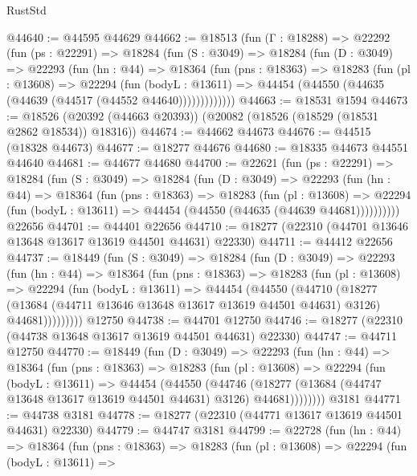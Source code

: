 \begin{lexlean}{RustStd}
\begin{coremodule}
@44640 := @44595 @44629
@44662 := @18513
    (fun (Γ : @18288) =>
    @22292
      (fun (ps : @22291) =>
      @18284
        (fun (S : @3049) =>
        @18284
          (fun (D : @3049) =>
          @22293
            (fun (hn : @44) =>
            @18364
              (fun (pns : @18363) =>
              @18283
                (fun (pl : @13608) =>
                @22294
                  (fun (bodyL : @13611) =>
                  @44454 (@44550 (@44635 (@44639 (@44517 (@44552 @44640)))))))))))))
@44663 := @18531 @1594
@44673 := @18526 (@20392 (@44663 @20393)) (@20082 (@18526 (@18529 (@18531 @2862 @18534)) @18316))
@44674 := @44662 @44673
@44676 := @44515 (@18328 @44673)
@44677 := @18277 @44676
@44680 := @18335 @44673 @44551 @44640
@44681 := @44677 @44680
@44700 := @22621
    (fun (ps : @22291) =>
    @18284
      (fun (S : @3049) =>
      @18284
        (fun (D : @3049) =>
        @22293
          (fun (hn : @44) =>
          @18364
            (fun (pns : @18363) =>
            @18283
              (fun (pl : @13608) =>
              @22294 (fun (bodyL : @13611) => @44454 (@44550 (@44635 (@44639 @44681))))))))))
    @22656
@44701 := @44401 @22656
@44710 := @18277 (@22310 (@44701 @13646 @13648 @13617 @13619 @44501 @44631) @22330)
@44711 := @44412 @22656
@44737 := @18449
    (fun (S : @3049) =>
    @18284
      (fun (D : @3049) =>
      @22293
        (fun (hn : @44) =>
        @18364
          (fun (pns : @18363) =>
          @18283
            (fun (pl : @13608) =>
            @22294
              (fun (bodyL : @13611) =>
              @44454
                (@44550
                  (@44710
                    (@18277
                      (@13684 (@44711 @13646 @13648 @13617 @13619 @44501 @44631) @3126)
                      @44681)))))))))
    @12750
@44738 := @44701 @12750
@44746 := @18277 (@22310 (@44738 @13648 @13617 @13619 @44501 @44631) @22330)
@44747 := @44711 @12750
@44770 := @18449
    (fun (D : @3049) =>
    @22293
      (fun (hn : @44) =>
      @18364
        (fun (pns : @18363) =>
        @18283
          (fun (pl : @13608) =>
          @22294
            (fun (bodyL : @13611) =>
            @44454
              (@44550
                (@44746
                  (@18277 (@13684 (@44747 @13648 @13617 @13619 @44501 @44631) @3126) @44681))))))))
    @3181
@44771 := @44738 @3181
@44778 := @18277 (@22310 (@44771 @13617 @13619 @44501 @44631) @22330)
@44779 := @44747 @3181
@44799 := @22728
    (fun (hn : @44) =>
    @18364
      (fun (pns : @18363) =>
      @18283
        (fun (pl : @13608) =>
        @22294
          (fun (bodyL : @13611) =>

\end{coremodule}
\end{lexlean}
